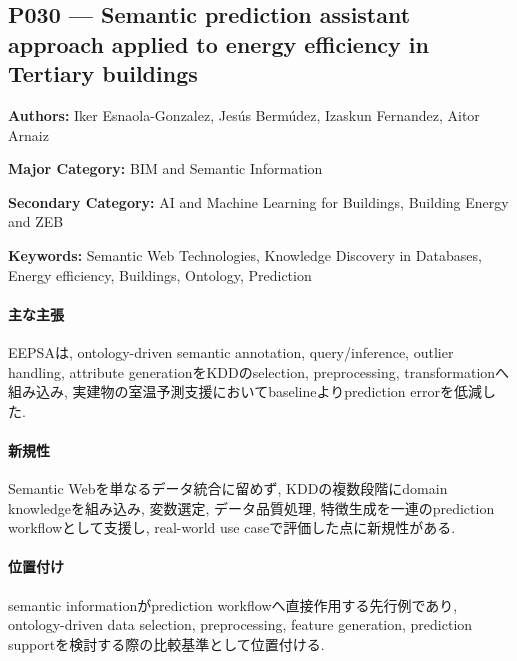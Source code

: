 \subsection{P030 --- Semantic prediction assistant approach applied to energy efficiency in Tertiary buildings}
\label{paper:P030}
\textbf{Authors:} Iker Esnaola-Gonzalez, Jesús Bermúdez, Izaskun Fernandez, Aitor Arnaiz\par
\textbf{Major Category:} BIM and Semantic Information\par
\textbf{Secondary Category:} AI and Machine Learning for Buildings, Building Energy and ZEB\par
\textbf{Keywords:} Semantic Web Technologies, Knowledge Discovery in Databases, Energy efficiency, Buildings, Ontology, Prediction\par
\paragraph{主な主張}
EEPSAは, ontology-driven semantic annotation, query/inference, outlier handling, attribute generationをKDDのselection, preprocessing, transformationへ組み込み, 実建物の室温予測支援においてbaselineよりprediction errorを低減した. \cite{EsnaolaGonzalez:2018SemanticPredictionAssistant}
\paragraph{新規性}
Semantic Webを単なるデータ統合に留めず, KDDの複数段階にdomain knowledgeを組み込み, 変数選定, データ品質処理, 特徴生成を一連のprediction workflowとして支援し, real-world use caseで評価した点に新規性がある.
\paragraph{位置付け}
semantic informationがprediction workflowへ直接作用する先行例であり, ontology-driven data selection, preprocessing, feature generation, prediction supportを検討する際の比較基準として位置付ける.
